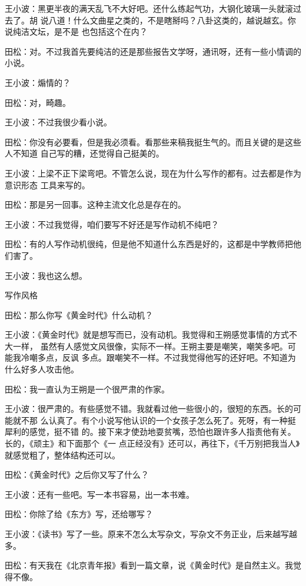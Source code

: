 王小波：黑更半夜的满天乱飞不大好吧。还什么练起气功，大钢化玻璃一头就滚过去了。胡
说八道！什么文曲星之类的，不是瞎掰吗？八卦这类的，越说越玄。你说纯洁文坛，是不是
也包括这个在内？


田松：对。不过我首先要纯洁的还是那些报告文学呀，通讯呀，还有一些小情调的小说。


王小波：煽情的？


田松：对，畸趣。


王小波：不过我很少看小说。


田松：你没有必要看，但是我必须看。看那些来稿我挺生气的。而且关键的是这些人不知道
自己写的糟，还觉得自己挺美的。


王小波：上梁不正下梁弯吧。不管怎么说，现在为什么写作的都有。过去都是作为意识形态
工具来写的。


田松：那是另一回事。这种主流文化总是存在的。


王小波：不过我觉得，咱们要写不好还是写作动机不纯吧？


田松：有的人写作动机很纯，但是他不知道什么东西是好的，这都是中学教师把他们害了。



王小波：我也这么想。


写作风格


田松：那么你写《黄金时代》什么动机？


王小波：《黄金时代》就是想写而已，没有动机。我觉得和王朔感觉事情的方式不大一样，
虽然有人感觉文风很像，实际不一样。王朔主要是嘲笑，嘲笑多吧。可能我冷嘲多点，反讽
多点。跟嘲笑不一样。不过我觉得他写的还好吧。不知道为什么好多人攻击他。


田松：我一直认为王朔是一个很严肃的作家。


王小波：很严肃的。有些感觉不错。我就看过他一些很小的，很短的东西。长的可能就不那
么认真了。有个小说写他认识的一个女孩子怎么死了。死呀，有一种挺犀利的感觉，挺不错
的。接下来才使劲地耍贫嘴，恐怕也跟许多人指责他有关。长的，《顽主》和下面那个《一
点正经没有》还可以，再往下，《千万别把我当人》就感觉粗了，整体结构还可以。


田松：《黄金时代》之后你又写了什么？


王小波：还有一些吧。写一本书容易，出一本书难。


田松：你除了给《东方》写，还给哪写？


王小波：《读书》写了一些。原来不怎么太写杂文，写杂文不务正业，后来越写越多。


田松：有天我在《北京青年报》看到一篇文章，说《黄金时代》是自然主义。我觉得不像。



